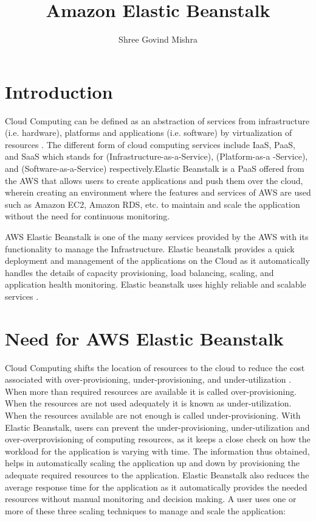 \documentclass[9pt,twocolumn,twoside]{../../styles/osajnl}
\title{Amazon Elastic Beanstalk}
\author[1]{Shree Govind Mishra}
\affil[1]{School of Informatics and Computing, Bloomington, IN 47408, U.S.A.}
\affil[*]{Corresponding authors: shremish@indiana.edu}
\begin{document}
\maketitle

\section{Introduction}

Cloud Computing can be defined as an abstraction of services from
infrastructure (i.e. hardware), platforms and applications (i.e.
software) by virtualization of resources \cite{elastic-beanstalk}.
The different form of cloud computing services include IaaS, PaaS,
and SaaS which stands for (Infrastructure-as-a-Service),
(Platform-as-a -Service), and (Software-as-a-Service)
respectively.Elastic Beanstalk is a PaaS offered from the AWS that
allows users to create applications and push them over the cloud,
wherein creating an environment where the features and services of AWS
are used such as Amazon EC2, Amazon RDS, etc. to maintain and scale
the application without the need for continuous monitoring.

AWS Elastic Beanstalk is one of the many services provided by the AWS
with its functionality to manage the Infrastructure. Elastic beanstalk
provides a quick deployment and management of the applications on the
Cloud as it automatically handles the details of capacity
provisioning, load balancing, scaling, and application health
monitoring. Elastic beanstalk uses highly reliable and scalable
services \cite{elastic-beanstalk-2}.

\section{Need for AWS Elastic Beanstalk}

Cloud Computing shifts the location of resources to the cloud to
reduce the cost associated with over-provisioning, under-provisioning,
and under-utilization \cite{cloudcomputing}. When more than required
resources are available it is called over-provisioning. When the
resources are not used adequately it is known as
under-utilization. When the resources available are not enough is
called under-provisioning. With Elastic Beanstalk, users can prevent
the under-provisioning, under-utilization and over-overprovisioning of
computing resources, as it keeps a close check on how the workload for
the application is varying with time. The information thus obtained,
helps in automatically scaling the application up and down by
provisioning the adequate required resources to the
application. Elastic Beanstalk also reduces the average response time
for the application as it automatically provides the needed resources
without manual monitoring and decision making. A user uses one or more
of these three scaling techniques to manage and scale the application:
\end{document}
